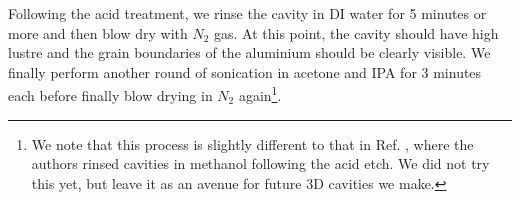 Following the acid treatment, we rinse the cavity in DI water for 5 minutes or more and then blow dry with $N_2$ gas. At this point, the cavity should have high lustre and the grain boundaries of the aluminium should be clearly visible. We finally perform another round of sonication in acetone and IPA for 3 minutes each before finally blow drying in $N_2$ again\footnote{We note that this process is slightly different to that in Ref. \cite{reagor2013reaching}, where the authors rinsed cavities in methanol following the acid etch. We did not try this yet, but leave it as an avenue for future 3D cavities we make.}.


\printbibliography[heading=subbibliography, title = References]